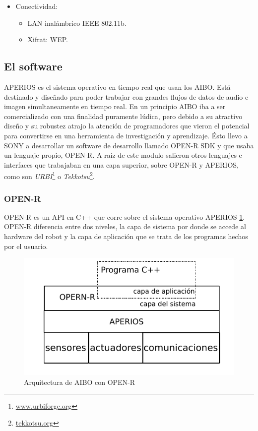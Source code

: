 \documentclass[12pt,a4paper,final,twoside]{article}
\begin{document}
\begin{itemize}
\item Conectividad:
\begin{itemize}
\item LAN inalámbrico IEEE 802.11b.
\item Xifrat: WEP.
\end{itemize}
\end{itemize}

\subsection{El software}
APERIOS es el sistema operativo en tiempo real que usan los AIBO. Está destinado y diseñado para poder trabajar con grandes flujos de datos de audio e imagen simultaneamente en tiempo real.
En un principio AIBO iba a ser comercializado con una finalidad puramente lúdica, pero debido a su atractivo diseño y su robustez atrajo la atención de programadores que vieron el potencial para convertirse en una herramienta de investigación y aprendizaje. Ésto llevo a SONY a desarrollar un software de desarrollo llamado OPEN-R SDK y que usaba un lenguaje propio, OPEN-R. A raíz de este modulo salieron otros lenguajes e interfaces que trabajaban en una capa superior, sobre OPEN-R y APERIOS, como son \textit{URBI}\footnote{\url{www.urbiforge.org}} o \textit{Tekkotsu}\footnote{\url{tekkotsu.org}}.

\subsubsection{OPEN-R}
OPEN-R es un API en C++ que corre sobre el sistema operativo APERIOS \ref{fig:openrarch}. OPEN-R diferencia entre dos niveles, la capa de sistema por donde se accede al hardware del robot y la capa de aplicación que se trata de los programas hechos por el usuario.

\begin{figure}[h!]
	\centering
    \includegraphics[scale=1]{images/openrarch.pdf}
	 \caption{Arquitectura de AIBO con OPEN-R}
  \label{fig:openrarch}
\end{figure}
\end{document}
